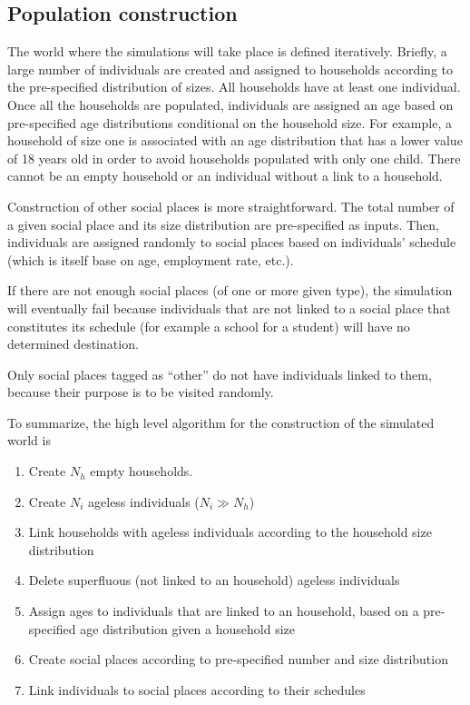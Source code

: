 \documentclass[11pt, onecolumn]{article}
\begin{document}
\subsection{Population construction}

The world where the simulations will take place is defined iteratively. Briefly, a large number of individuals are created and assigned to households according to the pre-specified distribution of sizes. All households have at least one individual. Once all the households are populated, individuals are assigned an age based on pre-specified age distributions conditional on the household size. For example, a household of size one is associated with an age distribution that has a lower value of 18 years old in order to avoid households populated with only one child. There cannot be an empty household or an individual without a link to a household.

Construction of other social places is more straightforward. The total number of a given social place and its size distribution are pre-specified as inputs. 
Then, individuals are assigned randomly to social places based on individuals' schedule (which is itself base on age, employment rate, etc.). 

If there are not enough social places (of one or more given type), the simulation will eventually fail because individuals that are not linked to a social place that constitutes its schedule (for example a school for a student) will have no determined destination. 


Only social places tagged as ``other'' do not have individuals linked to them, because their purpose is to be visited randomly. 

To summarize, the high level algorithm for the construction of the simulated world is
\begin{enumerate}
\item Create $N_h$ empty households. 
\item Create $N_i$ ageless individuals ($N_i \gg N_h$)
\item Link households with ageless individuals according to the household size distribution
\item Delete superfluous (not linked to an household) ageless individuals 
\item Assign ages to individuals that are linked to an household, based on a pre-specified age distribution given a household size
\item Create social places according to pre-specified number and size distribution
\item Link individuals to social places according to their schedules
\end{enumerate}
\end{document}
